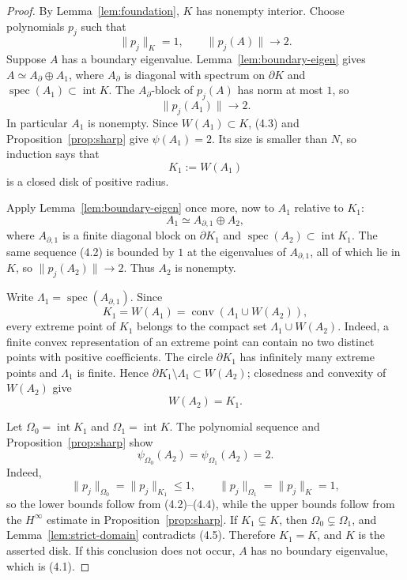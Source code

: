 \documentclass[preprints,article,submit,oneauthor]{Definitions/mdpi}
\numberwithin{equation}{section}
\newcommand{\spec}{\operatorname{spec}}
\newcommand{\conv}{\operatorname{conv}}
\newcommand{\Int}{\operatorname{int}}
\begin{document}
\begin{proof}
By Lemma~\ref{lem:foundation}, \(K\) has nonempty interior.  Choose
polynomials \(p_j\) such that
\[
 \|p_j\|_K=1,\qquad \|p_j(A)\|\longrightarrow2.       \tag{4.2}
\]
Suppose \(A\) has a boundary eigenvalue.  Lemma~\ref{lem:boundary-eigen} gives
\(A\simeq A_\partial\oplus A_1\), where \(A_\partial\) is diagonal with
spectrum on \(\partial K\) and \(\spec(A_1)\subset\Int K\).  The
\(A_\partial\)-block of \(p_j(A)\) has norm at most
\(1\), so
\[
 \|p_j(A_1)\|\longrightarrow2.                        \tag{4.3}
\]
In particular \(A_1\) is nonempty.  Since \(W(A_1)\subset K\), (4.3) and
Proposition~\ref{prop:sharp} give \(\psi(A_1)=2\).  Its size is smaller than
\(N\), so induction says that
\[
 K_1:=W(A_1)
\]
is a closed disk of positive radius.

Apply Lemma~\ref{lem:boundary-eigen} once more, now to \(A_1\) relative to
\(K_1\):
\[
 A_1\simeq A_{\partial,1}\oplus A_2,
\]
where \(A_{\partial,1}\) is a finite diagonal block on \(\partial K_1\) and
\(\spec(A_2)\subset\Int K_1\).  The same sequence (4.2) is bounded by \(1\) at
the eigenvalues of \(A_{\partial,1}\), all of which lie in \(K\), so
\(\|p_j(A_2)\|\to2\).  Thus \(A_2\) is nonempty.

Write \(\Lambda_1=\spec(A_{\partial,1})\).  Since
\[
 K_1=W(A_1)=\conv(\Lambda_1\cup W(A_2)),
\]
every extreme point of \(K_1\) belongs to the compact set
\(\Lambda_1\cup W(A_2)\).  Indeed, a finite convex representation of an
extreme point can contain no two distinct points with positive coefficients.
The circle \(\partial K_1\) has
infinitely many extreme points and \(\Lambda_1\) is finite.  Hence
\(\partial K_1\setminus\Lambda_1\subset W(A_2)\); closedness and convexity of
\(W(A_2)\) give
\[
 W(A_2)=K_1.                                           \tag{4.4}
\]

Let \(\Omega_0=\Int K_1\) and \(\Omega_1=\Int K\).  The polynomial sequence and
Proposition~\ref{prop:sharp} show
\[
 \psi_{\Omega_0}(A_2)=\psi_{\Omega_1}(A_2)=2.          \tag{4.5}
\]
Indeed,
\[
 \|p_j\|_{\Omega_0}=\|p_j\|_{K_1}\leq1,
 \qquad
 \|p_j\|_{\Omega_1}=\|p_j\|_K=1,
\]
so the lower bounds follow from (4.2)--(4.4), while the upper bounds follow
from the \(H^\infty\) estimate in Proposition~\ref{prop:sharp}.  If
\(K_1\subsetneq K\), then
\(\Omega_0\subsetneq\Omega_1\), and Lemma~\ref{lem:strict-domain} contradicts
(4.5).  Therefore \(K_1=K\), and \(K\) is the asserted disk.  If this conclusion
does not occur, \(A\) has no boundary eigenvalue, which is (4.1).
\end{proof}
\end{document}
